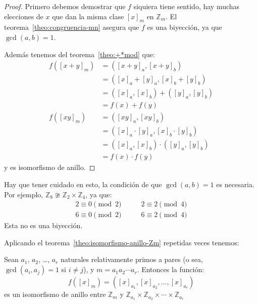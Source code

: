  \begin{proof}
    Primero debemos demostrar que \(f\) siquiera tiene sentido,
    hay muchas elecciones de \(x\)
    que dan la misma clase \([x]_m\) en \(\mathbb{Z}_m\).
    El teorema~\ref{theo:congruencia-mn}
    asegura que \(f\) es una biyección,
    ya que \(\gcd(a, b) = 1\).

    Además tenemos del teorema~\ref{theo:+*mod} que:
    \begin{align*}
      f([x + y]_m)
	&= ([x + y]_a, [x + y]_b) \\
	&= ([x]_a + [y]_a, [x]_b + [y]_b) \\
	&= ([x]_a, [x]_b)
	     + ([y]_a, [y]_b) \\
	&= f(x) + f(y) \\
      f([x y]_m)
	&= ([x y]_a, [x y]_b) \\
	&= ([x]_a \cdot [y]_a,
	     [x]_b \cdot [y]_b) \\
	&= ([x]_a, [x]_b)
	    \cdot ([y]_a, [y]_b) \\
	&= f(x) \cdot f(y)
    \end{align*}
    y es isomorfismo de anillo.
  \end{proof}
  Hay que tener cuidado en esto,
  la condición de que \(\gcd(a, b) = 1\) es necesaria.%
  Por ejemplo,
  \(\mathbb{Z}_8 \ncong \mathbb{Z}_2 \times \mathbb{Z}_4\),
  ya que:
  \begin{align*}
    2 \equiv 0 \pmod{2}
      &\qquad 2 \equiv 2 \pmod{4} \\
    6 \equiv 0 \pmod{2}
      &\qquad 6 \equiv 2 \pmod{4}
  \end{align*}
  Esta no es una biyección.

  Aplicando el teorema~\ref{theo:isomorfismo-anillo-Zm}
  repetidas veces tenemos:
  \begin{corollary}
    \label{cor:isomorfismo-anillo-Zm}
    Sean \(a_1\), \(a_2\), \ldots, \(a_r\)
    naturales relativamente primos a pares%
    (o sea,
     \(\gcd(a_i, a_j) = 1\) si \(i \ne j\)),
    y \(m = a_1 a_2 \dotsm a_r\).
    Entonces la función:
    \begin{equation*}
      f([x]_m)
	= ([x]_{a_1}, [x]_{a_2}, \dotsc, [x]_{a_r})
    \end{equation*}
    es un isomorfismo de anillo entre \(\mathbb{Z}_m\) y
    \(\mathbb{Z}_{a_1} \times \mathbb{Z}_{a_2}
	\times \dotsb \times \mathbb{Z}_{a_r}\)
  \end{corollary}

